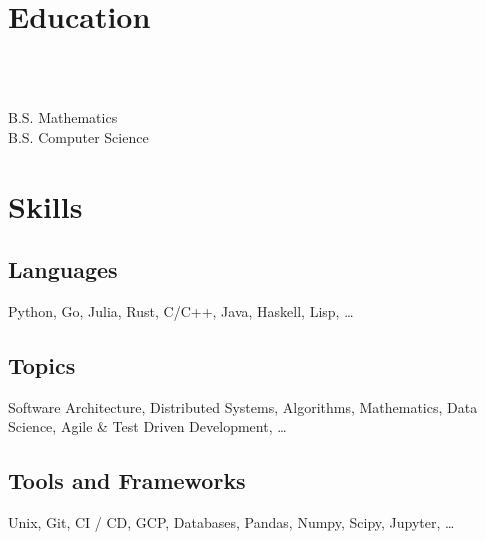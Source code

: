 \documentclass{tc_cv}
\begin{document}

\begin{minipage}[t]{0.3\linewidth}

  \vspace{1.5em}
  \section{Education}
  \\
  \date{Fall 2011 --- Spring 2016}\vspace{0.25em}\\
  \faGraduationCap \hspace{1ex} B.S. Mathematics\\
  \faGraduationCap \hspace{1ex} B.S. Computer Science

  \vspace{1.5em}
  \section{Skills}
  \subsection{Languages}
  Python,
  Go,
  Julia,
  Rust,
  C/C++,
  Java,
  Haskell,
  Lisp,
  \ldots

  \vspace{0.25em}
  \subsection{Topics}
  Software Architecture,
  Distributed Systems,
  Algorithms,
  Mathematics,
  Data Science,
  Agile \&
  Test Driven Development,
  \ldots

  \vspace{0.25em}
  \subsection{Tools and Frameworks}
  Unix,
  Git,
  CI / CD,
  GCP,
  Databases,
  Pandas, Numpy, Scipy,
  Jupyter,
  \ldots

  \vspace{0.25em}

\end{minipage}
\end{document}
